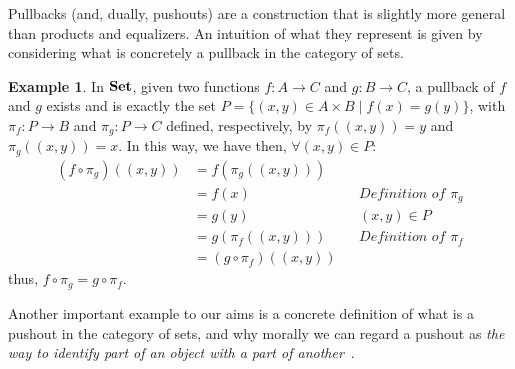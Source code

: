 \documentclass[a4paper, twoside,openright]{report}
\theoremstyle{plain}
\theoremstyle{definition}
\newtheorem{example}[theorem]{Example}
\begin{document}
Pullbacks (and, dually, pushouts) are a construction that is slightly more general than products and equalizers. An intuition of what they represent is given by considering what is concretely a pullback in the category of sets.

\begin{example}
    In $\mathbf{Set}$, given two functions $f: A \rightarrow C$ and $g: B \rightarrow C$, a pullback of $f$ and $g$ exists and is exactly the set $P = \{(x, y) \in A \times B \mid f(x) = g(y)\}$, with $\pi_f : P \rightarrow B$ and $\pi_g : P \rightarrow C$ defined, respectively, by $\pi_f((x, y)) = y$ and $\pi_g((x, y)) = x$. In this way, we have then, $\forall (x, y) \in P$:
    \begin{align*}
        (f \circ \pi_g) ((x, y))
                    &= f(\pi_g((x, y)))     &&  \\
                    & = f(x)                &&  \textit{Definition of $\pi_g$} \\
                    & = g(y)                &&  (x, y) \in P \\
                    & = g(\pi_f((x, y)))    &&  \textit{Definition of $\pi_f$} \\
                    & = (g \circ \pi_f) ((x, y)) && 
    \end{align*}
    thus, $f \circ \pi_g = g \circ \pi_f$.
\end{example}

Another important example to our aims is a concrete definition of what is a pushout in the category of sets, and why morally we can regard a pushout as \textit{the way to identify part of an object with a part of another}~\cite{Barr_Wells_1995}.
\end{document}

